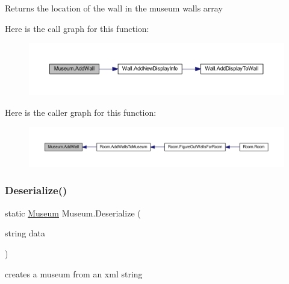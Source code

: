 \begin{DoxyReturn}{Returns}
the location of the wall in the museum walls array
\end{DoxyReturn}
Here is the call graph for this function\+:\nopagebreak
\begin{figure}[H]
\begin{center}
\leavevmode
\includegraphics[width=350pt]{class_museum_a6e441db98efeaa314ae974222aea08e6_cgraph}
\end{center}
\end{figure}
Here is the caller graph for this function\+:\nopagebreak
\begin{figure}[H]
\begin{center}
\leavevmode
\includegraphics[width=350pt]{class_museum_a6e441db98efeaa314ae974222aea08e6_icgraph}
\end{center}
\end{figure}
\mbox{\label{class_museum_a1b4fb627a19112e3ba3d25e8108de2c3}} 
\subsubsection{\texorpdfstring{Deserialize()}{Deserialize()}}
{\footnotesize\ttfamily static \mbox{\hyperlink{class_museum}{Museum}} Museum.\+Deserialize (\begin{DoxyParamCaption}\item[{string}]{data }\end{DoxyParamCaption})\hspace{0.3cm}{\ttfamily [static]}}



creates a museum from an xml string 


